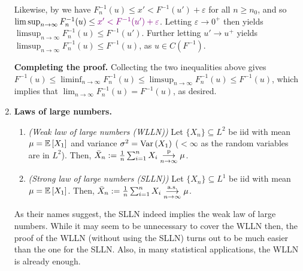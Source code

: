 \begin{enumerate}
\begin{pf}
Likewise, by  we have \(F_n^{-1}(u)\le
x'<F^{-1}(u')+\varepsilon\) for all \(n\ge n_0\), and so \(\limsup_{n\to
\infty}F_n^{-1}(u)\le \vc{x'<F^{-1}(u')+\varepsilon}\). Letting
\(\varepsilon\to 0^{+}\) then yields \(\limsup_{n\to \infty}F_n^{-1}(u)\le
F^{-1}(u')\). Further letting \(u'\to u^{+}\) yields \(\limsup_{n\to
\infty}F_n^{-1}(u)\le F^{-1}(u)\), as \(u\in C(F^{-1})\).

\textbf{Completing the proof.} Collecting the two inequalities above gives
\(F^{-1}(u)\le \liminf_{n\to \infty}F_n^{-1}(u)\le \limsup_{n\to \infty}F_n^{-1}(u)
\le F^{-1}(u)\), which implies that \(\lim_{n\to\infty}F_n^{-1}(u)=F^{-1}(u)\),
as desired.
\end{pf}
\item \textbf{Laws of large numbers.}
\begin{theorem}
\label{thm:lln}\hfill
\begin{enumerate}
\item \emph{(Weak law of large numbers (WLLN))} Let \(\{X_n\}\subseteq L^2\) be iid
with mean \(\mu=\mathbb{E}\left[X_1\right]\) and variance \(\sigma^2=\operatorname{Var}\left(X_1\right)\) (\(<\infty\)
as the random variables are in \(L^2\)). Then,
\(\bar{X}_n:=\frac{1}{n}\sum_{i=1}^{n}X_i\underset{n\to\infty}{\overset{\text{p}}{\longrightarrow}} \mu\).
\item \emph{(Strong law of large numbers (SLLN))}
Let \(\{X_n\}\subseteq L^1\) be iid with mean \(\mu=\mathbb{E}\left[X_1\right]\). Then,
\(\bar{X}_n:=\frac{1}{n}\sum_{i=1}^{n}X_i\underset{n\to\infty}{\overset{\text{a.s.}}{\longrightarrow}} \mu\).
\end{enumerate}
\end{theorem}
\begin{note}
As their names suggest, the SLLN indeed implies the weak law of large numbers.
While it may seem to be unnecessary to cover the WLLN then, the proof of the
WLLN (without using the SLLN) turns out to be much easier than the one for the
SLLN. Also, in many statistical applications, the WLLN is already enough.
\end{note}


\end{enumerate}
